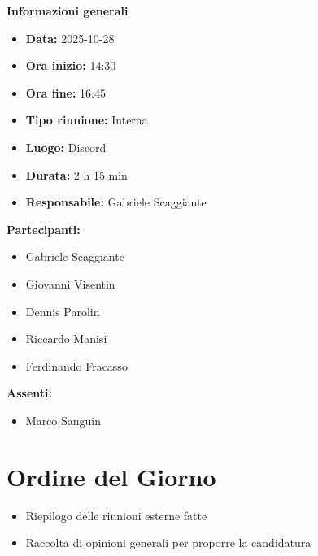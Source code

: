 \documentclass[a4paper,12pt]{article}
\begin{document}
\clearpage
{\large \textbf{Informazioni generali}}
{\footnotesize
{}

\begin{itemize}
    \item \textbf{Data:} 2025-10-28
    \item \textbf{Ora inizio:} 14:30
    \item \textbf{Ora fine:} 16:45
    \item \textbf{Tipo riunione:} Interna
    \item \textbf{Luogo:} Discord
    \item \textbf{Durata:} 2 h 15 min
    \item \textbf{Responsabile:} Gabriele Scaggiante
\end{itemize}

\vspace{0.2cm}

\textbf{Partecipanti:}
\begin{itemize}
    \item Gabriele Scaggiante
    \item Giovanni Visentin
    \item Dennis Parolin 
    \item Riccardo Manisi
    \item Ferdinando Fracasso
\end{itemize}

\textbf{Assenti:}
\begin{itemize}
    \item Marco Sanguin
\end{itemize}
}

\vspace{0.5cm}

\vspace{0.8cm}

\clearpage
\tableofcontents
\thispagestyle{empty} %
\clearpage

\section{Ordine del Giorno}
\begin{itemize}
    \item Riepilogo delle riunioni esterne fatte
    \item Raccolta di opinioni generali per proporre la candidatura
\end{itemize}
\end{document}
